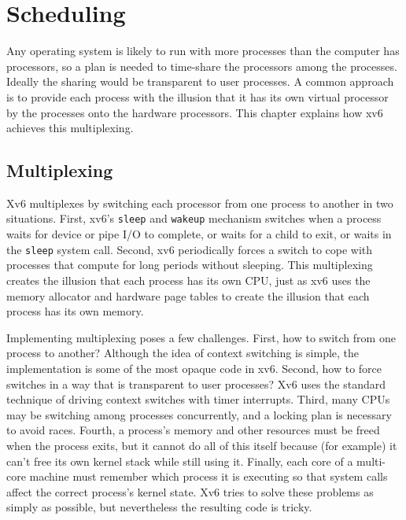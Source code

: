 % 
%  
\chapter{Scheduling}
\label{CH:SCHED}

Any operating system is likely to run with more processes than the
computer has processors, so a plan is needed to time-share the
processors among the processes. Ideally the sharing would be transparent to user
processes.  A common approach is to provide each process
with the illusion that it has its own virtual processor by
the processes onto the hardware processors.
This chapter explains how xv6 achieves this multiplexing.
\section{Multiplexing}

Xv6 multiplexes by switching each processor from one process to
another in two situations. First, xv6's
\lstinline{sleep}
and
\lstinline{wakeup}
mechanism switches when a process waits
for device or pipe I/O to complete, or waits for a child
to exit, or waits in the
\lstinline{sleep}
system call.
Second, xv6 periodically forces a switch to cope with
processes that compute for long periods without sleeping.
This multiplexing creates the illusion that
each process has its own CPU, just as xv6 uses the memory allocator and hardware
page tables to create the illusion that each process has its own memory.

Implementing multiplexing poses a few challenges. First, how to switch from one
process to another? 
Although the idea of context switching
is simple, the implementation is some of the most opaque code
in xv6. Second, how to force
switches in a way that is transparent to user processes?  Xv6 uses the
standard technique of driving context switches with timer interrupts.
Third, many CPUs may be switching among processes concurrently, and a
locking plan is necessary to avoid races. Fourth, a process's
memory and other resources must be freed when the process exits,
but it cannot do all of this itself
because (for example) it can't free its own kernel stack while still using it.
Finally, each core of a multi-core machine must remember which
process it is executing so that system calls affect the correct
process's kernel state.
Xv6 tries to solve these problems as
simply as possible, but nevertheless the resulting code is
tricky.

